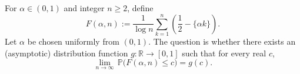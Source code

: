 For $\alpha\in(0,1)$ and integer $n\ge 2$, define
\[
F(\alpha,n) := \frac{1}{\log n}\sum_{k=1}^n \left(\frac12 - \{\alpha k\}\right).
\]
Let $\alpha$ be chosen uniformly from $(0,1)$.  The question is whether there exists an (asymptotic) distribution function $g:\mathbb{R}\to[0,1]$ such that for every real $c$,
\[
\lim_{n\to\infty}\,\mathbb{P}\bigl(F(\alpha,n)\le c\bigr)=g(c).
\]
